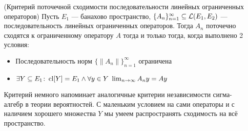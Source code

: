 \begin{theorem} (Критерий поточечной сходимости последовательности линейных ограниченных операторов)
	Пусть $E_1$ --- банахово пространство, $\{A_n\}_{n = 1}^\infty \subseteq \mathcal{L}(E_1, E_2)$ --- последовательность линейных ограниченных операторов. Тогда $A_n$ поточечно сходятся к ограниченному оператору $A$ тогда и только тогда, когда выполнено 2 условия:
	\begin{itemize}
		\item Последовательность норм $\{\|A_n\|\}_{n = 1}^\infty$ ограничена
		
		\item $\exists Y \subseteq E_1 \colon \operatorname{cl} [Y] = E_1 \wedge \forall y \in Y\ \lim_{n \to \infty} A_ny = Ay$
	\end{itemize}
\end{theorem}

\begin{anote}
	Критерий немного напоминает аналогичные критерии независимости сигма-алгебр в теории вероятностей. С маленьким условием на сами операторы и с наличием хорошего множества $Y$ мы умеем распространять сходимость на всё пространство.
\end{anote}

